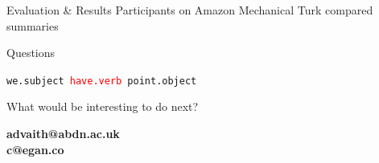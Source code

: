 \documentclass{beamer}
\begin{document}
  \begin{frame}{Evaluation \& Results}
    Participants on Amazon Mechanical Turk compared summaries

	\begin{center}
	\end{center}
  \end{frame}

  \begin{frame}{Questions}
    \begin{center}
      \texttt{we.subject \textcolor{red}{have.verb} point.object}

      What would be interesting to do next?

      \vfill
      \begin{center}
        \textbf{advaith@abdn.ac.uk} \\ \textbf{c@egan.co}
      \end{center}
    \end{center}
  \end{frame}
\end{document}
